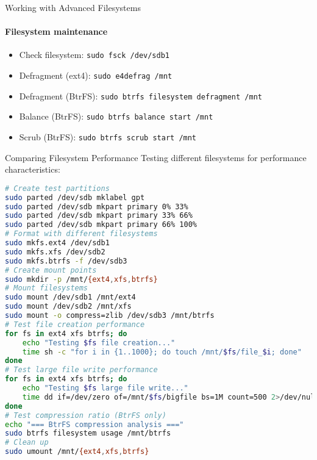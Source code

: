 \begin{KR}{Working with Advanced Filesystems}
    \paragraph{Filesystem maintenance}
    \begin{itemize}
        \item Check filesystem: \texttt{sudo fsck /dev/sdb1}
        \item Defragment (ext4): \texttt{sudo e4defrag /mnt}
        \item Defragment (BtrFS): \texttt{sudo btrfs filesystem defragment /mnt}
        \item Balance (BtrFS): \texttt{sudo btrfs balance start /mnt}
        \item Scrub (BtrFS): \texttt{sudo btrfs scrub start /mnt}
    \end{itemize}
\end{KR}

\begin{example2}{Comparing Filesystem Performance}
    Testing different filesystems for performance characteristics:
    
\begin{lstlisting}[language=bash, style=basesmol]
# Create test partitions
sudo parted /dev/sdb mklabel gpt
sudo parted /dev/sdb mkpart primary 0% 33%
sudo parted /dev/sdb mkpart primary 33% 66%
sudo parted /dev/sdb mkpart primary 66% 100%
# Format with different filesystems
sudo mkfs.ext4 /dev/sdb1
sudo mkfs.xfs /dev/sdb2
sudo mkfs.btrfs -f /dev/sdb3
# Create mount points
sudo mkdir -p /mnt/{ext4,xfs,btrfs}
# Mount filesystems
sudo mount /dev/sdb1 /mnt/ext4
sudo mount /dev/sdb2 /mnt/xfs
sudo mount -o compress=zlib /dev/sdb3 /mnt/btrfs
# Test file creation performance
for fs in ext4 xfs btrfs; do
    echo "Testing $fs file creation..."
    time sh -c "for i in {1..1000}; do touch /mnt/$fs/file_$i; done"
done
# Test large file write performance
for fs in ext4 xfs btrfs; do
    echo "Testing $fs large file write..."
    time dd if=/dev/zero of=/mnt/$fs/bigfile bs=1M count=500 2>/dev/null
done
# Test compression ratio (BtrFS only)
echo "=== BtrFS compression analysis ==="
sudo btrfs filesystem usage /mnt/btrfs
# Clean up
sudo umount /mnt/{ext4,xfs,btrfs}
\end{lstlisting}
\end{example2}

